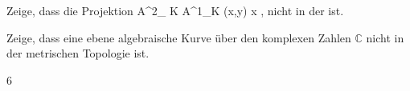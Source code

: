 

{}


{


Zeige, dass die Projektion
\maabbeledisp {} { {\mathbb A}^{2}_{ K } } { {\mathbb A}^{1}_{K}
} { (x,y) } { x
} {,}
nicht
in der 
ist.


}


{} {}




{}


{


Zeige, dass eine ebene algebraische Kurve über den komplexen Zahlen $\mathbb C$ nicht  in der metrischen Topologie ist.


}


{} {}






{6}


